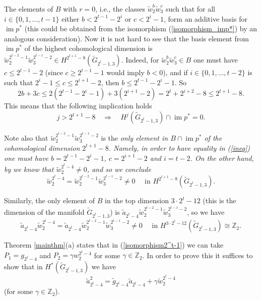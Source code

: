\documentclass{amsart}
\newcommand{\im}{\operatorname{im}}
\theoremstyle{definition}
\theoremstyle{remark}
\numberwithin{equation}{section}
\begin{document}
The elements of $B$ with $r=0$, i.e., the classes $\widetilde w_2^b\widetilde w_3^c$ such that for all $i\in\{0,1,\ldots,t-1\}$ either $b<2^{t-1}-2^i$ or $c<2^i-1$, form an additive basis for $\im p^*$ (this could be obtained from the isomorphism (\ref{isomorphism_imp*}) by an analogous consideration). Now it is not hard to see that the basis element from $\im p^*$ of the highest cohomological dimension is $\widetilde w_2^{2^{t-2}-1}\widetilde w_3^{2^{t-1}-2}\in H^{2^{t+1}-8}(\widetilde G_{2^t-1,3})$. Indeed, for $\widetilde w_2^b\widetilde w_3^c\in B$ one must have $c\le2^{t-1}-2$ (since $c\ge2^{t-1}-1$ would imply $b<0$), and if $i\in\{0,1,\ldots,t-2\}$ is such that $2^i-1\le c\le2^{i+1}-2$, then $b\le2^{t-1}-2^i-1$. So
\begin{equation}\label{ineq}
2b+3c\le2(2^{t-1}-2^i-1)+3(2^{i+1}-2)=2^t+2^{i+2}-8\le2^{t+1}-8.
\end{equation}
This means that the following implication holds
\begin{equation}\label{propimp*}
 j>2^{t+1}-8 \quad \Longrightarrow \quad H^j(\widetilde G_{2^t-1,3})\cap\im p^*=0.  
\end{equation}

Note also that $\widetilde w_2^{2^{t-2}-1}\widetilde w_3^{2^{t-1}-2}$ is the \em only \em element in $B\cap\im p^*$ of the cohomological dimension $2^{t+1}-8$. Namely, in order to have equality in (\ref{ineq}) one must have $b=2^{t-1}-2^i-1$, $c=2^{i+1}-2$ and $i=t-2$. On the other hand, by \cite[Corollary 4.12]{Fukaya} we know that $\widetilde w_2^{2^t-4}\neq0$, and so we conclude
\begin{equation}\label{visina_w_2}
 \widetilde w_2^{2^t-4}=\widetilde w_2^{2^{t-2}-1}\widetilde w_3^{2^{t-1}-2}\neq0 \quad \mbox{ in } H^{2^{t+1}-8}(\widetilde G_{2^t-1,3}).  
\end{equation}

Similarly, the only element of $B$ in the top dimension $3\cdot2^t-12$ (this is the dimension of the manifold $\widetilde G_{2^t-1,3}$) is $\widetilde a_{2^t-4}\widetilde w_2^{2^{t-2}-1}\widetilde w_3^{2^{t-1}-2}$, so we have
\begin{equation}\label{topdim}
 \widetilde a_{2^t-4}\widetilde w_2^{2^t-4}=\widetilde a_{2^t-4}\widetilde w_2^{2^{t-2}-1}\widetilde w_3^{2^{t-1}-2}\neq0 \quad \mbox{ in } H^{3\cdot2^t-12}(\widetilde G_{2^t-1,3})\cong\mathbb Z_2.  
\end{equation}

\medskip

Theorem \ref{mainthm}(a) states that in (\ref{isomorphism2^t-1}) we can take $P_1=g_{2^t-4}$ and $P_2=\gamma w_2^{2^t-4}$ for some $\gamma\in\mathbb Z_2$. In order to prove this it suffices to show that in $H^*(\widetilde G_{2^t-1,3})$ we have
\begin{equation}\label{eq}
\widetilde a_{2^t-4}^2=\widetilde g_{2^t-4}\widetilde a_{2^t-4}+\gamma\widetilde w_2^{2^t-4}
\end{equation}
(for some $\gamma\in\mathbb Z_2$).
\end{document}
